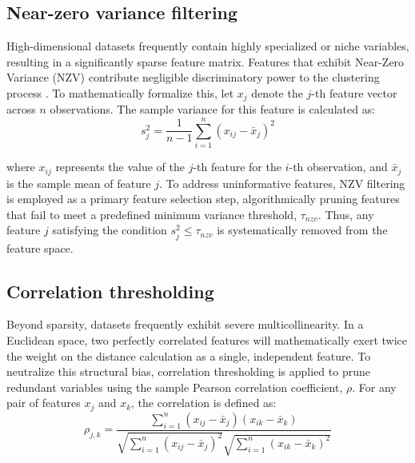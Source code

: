         \subsection{Near-zero variance filtering}
        \label{subsec:nzv_filtering}
        High-dimensional datasets frequently contain highly specialized or niche variables, resulting in a significantly sparse feature matrix.
        Features that exhibit Near-Zero Variance (NZV) contribute negligible discriminatory power to the clustering process \cite{ochoteco_asensio_predicting_2022}.
        To mathematically formalize this, let $x_j$ denote the $j$-th feature vector across $n$ observations.
        The sample variance for this feature is calculated as:
        \begin{equation}
            s_j^2 = \frac{1}{n-1} \sum_{i=1}^{n} (x_{ij} - \bar{x}_j)^2
        \end{equation}
        
        where $x_{ij}$ represents the value of the $j$-th feature for the $i$-th observation, and $\bar{x}_j$ is the sample mean of feature $j$.
        To address uninformative features, NZV filtering is employed as a primary feature selection step, algorithmically pruning features that fail to meet a predefined minimum variance threshold, $\tau_{nzv}$.
        Thus, any feature $j$ satisfying the condition $s_j^2 \le \tau_{nzv}$ is systematically removed from the feature space.
        
        \subsection{Correlation thresholding}
        \label{subsec:correlation_thresholding}
        Beyond sparsity, datasets frequently exhibit severe multicollinearity.
        In a Euclidean space, two perfectly correlated features will mathematically exert twice the weight on the distance calculation as a single, independent feature.
        To neutralize this structural bias, correlation thresholding is applied to prune redundant variables using the sample Pearson correlation coefficient, $\rho$.
        For any pair of features $x_j$ and $x_k$, the correlation is defined as:
        \begin{equation}
            \rho_{j,k} = \frac{\sum_{i=1}^{n} (x_{ij} - \bar{x}_j)(x_{ik} - \bar{x}_k)}{\sqrt{\sum_{i=1}^{n} (x_{ij} - \bar{x}_j)^2} \sqrt{\sum_{i=1}^{n} (x_{ik} - \bar{x}_k)^2}}
        \end{equation}
        
